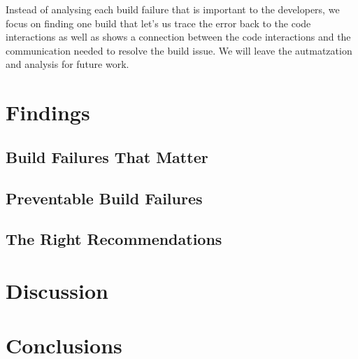 Instead of analysing each build failure that is important to the developers, we focus on finding one build that let's us trace the error back to the code interactions as well as shows a connection between the code interactions and the communication needed to resolve the build issue.
We will leave the autmatzation and analysis for future work.

\section{Findings}
\subsection{Build Failures That Matter}



\subsection{Preventable Build Failures}

\subsection{The Right Recommendations}

\section{Discussion}
\section{Conclusions}

